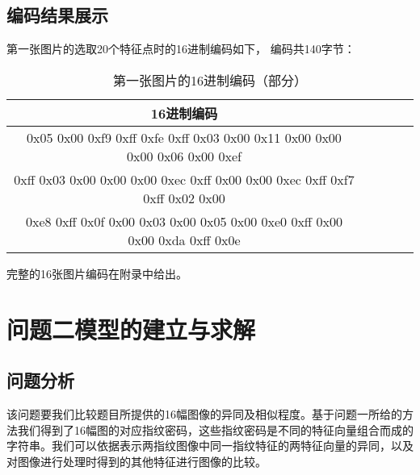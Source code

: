 \documentclass[withoutpreface,bwprint]{cumcmthesis} %
\begin{document}
\subsection{编码结果展示}
第一张图片的选取20个特征点时的16进制编码如下，
编码共140字节：
\begin{table}[!htbp]
	\caption{第一张图片的16进制编码（部分）} \centering
	\begin{tabular}{ccccc}
		\toprule[1.5pt]
		16进制编码 \\
		\midrule[1pt]
		0x05 0x00 0xf9 0xff 0xfe 0xff 0x03 0x00 0x11 0x00 0x00 0x00 0x06 0x00 0xef \\
		0xff 0x03 0x00 0x00 0x00 0xec 0xff 0x00 0x00 0xec 0xff 0xf7 0xff 0x02 0x00    \\
		0xe8 0xff 0x0f 0x00 0x03 0x00 0x05 0x00 0xe0 0xff 0x00 0x00 0xda 0xff 0x0e \\
		\bottomrule[1.5pt]
	\end{tabular}
\end{table}
完整的16张图片编码在附录中给出。



\section{问题二模型的建立与求解}
\subsection{问题分析}
该问题要我们比较题目所提供的16幅图像的异同及相似程度。基于问题一所给的方法我们得到了16幅图的对应指纹密码，这些指纹密码是不同的特征向量组合而成的字符串。我们可以依据表示两指纹图像中同一指纹特征的两特征向量的异同，以及对图像进行处理时得到的其他特征进行图像的比较。

														
\end{document}
